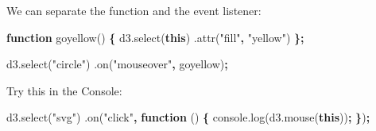 \documentclass[openany]{book}
\newenvironment{Shaded}{\begin{snugshade}}{\end{snugshade}}
\newcommand{\AttributeTok}[1]{\textcolor[rgb]{0.77,0.63,0.00}{#1}}
\newcommand{\KeywordTok}[1]{\textcolor[rgb]{0.13,0.29,0.53}{\textbf{#1}}}
\newcommand{\NormalTok}[1]{#1}
\newcommand{\OperatorTok}[1]{\textcolor[rgb]{0.81,0.36,0.00}{\textbf{#1}}}
\newcommand{\SpecialCharTok}[1]{\textcolor[rgb]{0.00,0.00,0.00}{#1}}
\newcommand{\StringTok}[1]{\textcolor[rgb]{0.31,0.60,0.02}{#1}}
\newcommand{\VariableTok}[1]{\textcolor[rgb]{0.00,0.00,0.00}{#1}}
\newcommand{\VerbatimStringTok}[1]{\textcolor[rgb]{0.31,0.60,0.02}{#1}}
\begin{document}
\begin{Shaded}
\end{Shaded}

We can separate the function and the event listener:

\begin{Shaded}
\begin{Highlighting}[]
\KeywordTok{function} \AttributeTok{goyellow}\NormalTok{() }\OperatorTok{\{}
  \VariableTok{d3}\NormalTok{.}\AttributeTok{select}\NormalTok{(}\KeywordTok{this}\NormalTok{)}
\NormalTok{    .}\AttributeTok{attr}\NormalTok{(}\StringTok{"fill"}\OperatorTok{,} \StringTok{"yellow"}\NormalTok{)}
    \OperatorTok{\};}
\end{Highlighting}
\end{Shaded}

\begin{Shaded}
\begin{Highlighting}[]
\VariableTok{d3}\NormalTok{.}\AttributeTok{select}\NormalTok{(}\StringTok{"circle"}\NormalTok{)}
\NormalTok{  .}\AttributeTok{on}\NormalTok{(}\StringTok{"mouseover"}\OperatorTok{,}\NormalTok{ goyellow)}\OperatorTok{;}
\end{Highlighting}
\end{Shaded}

Try this in the Console:

\begin{Shaded}
\begin{Highlighting}[]
\VariableTok{d3}\NormalTok{.}\AttributeTok{select}\NormalTok{(}\StringTok{"svg"}\NormalTok{)}
\NormalTok{  .}\AttributeTok{on}\NormalTok{(}\StringTok{"click"}\OperatorTok{,} \KeywordTok{function}\NormalTok{ () }\OperatorTok{\{}
    \VariableTok{console}\NormalTok{.}\AttributeTok{log}\NormalTok{(}\VariableTok{d3}\NormalTok{.}\AttributeTok{mouse}\NormalTok{(}\KeywordTok{this}\NormalTok{))}\OperatorTok{;}
    \OperatorTok{\}}\NormalTok{)}\OperatorTok{;}
\end{Highlighting}
\end{Shaded}
\end{document}
